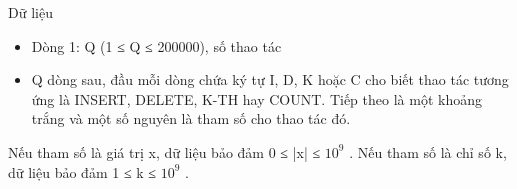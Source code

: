 Dữ liệu
\begin{itemize}
	\item     Dòng 1: Q (1 ≤ Q ≤ 200000), số thao tác   
	\item     Q dòng sau, đầu mỗi dòng chứa ký tự I, D, K hoặc C cho biết thao tác tương ứng là INSERT, DELETE, K-TH hay COUNT. Tiếp theo là một khoảng trắng và một số nguyên là tham số cho thao tác đó.   
\end{itemize}

   Nếu tham số là giá trị x, dữ liệu bảo đảm 0 ≤ |x| ≤ $10^{9}$   . Nếu tham số là chỉ số k, dữ liệu bảo đảm 1 ≤ k ≤ $10^{9}$   .